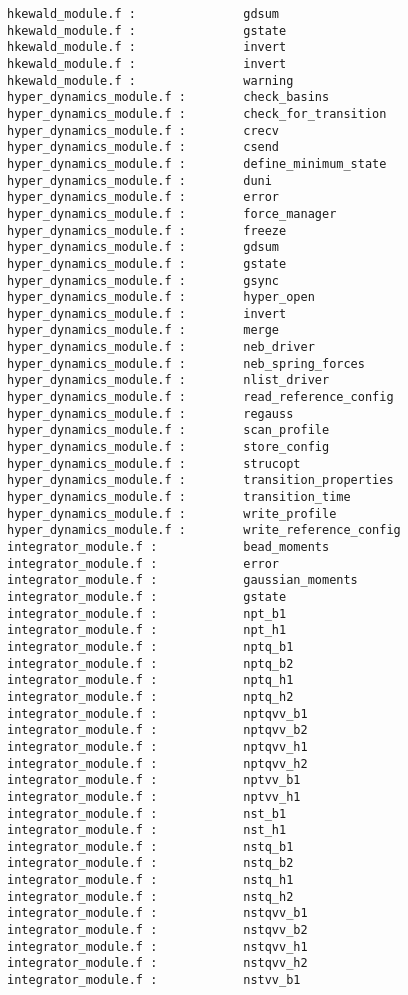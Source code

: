 \begin{verbatim}
hkewald_module.f :               gdsum 
hkewald_module.f :               gstate 
hkewald_module.f :               invert 
hkewald_module.f :               invert 
hkewald_module.f :               warning 
hyper_dynamics_module.f :        check_basins 
hyper_dynamics_module.f :        check_for_transition 
hyper_dynamics_module.f :        crecv 
hyper_dynamics_module.f :        csend 
hyper_dynamics_module.f :        define_minimum_state 
hyper_dynamics_module.f :        duni
hyper_dynamics_module.f :        error 
hyper_dynamics_module.f :        force_manager 
hyper_dynamics_module.f :        freeze 
hyper_dynamics_module.f :        gdsum 
hyper_dynamics_module.f :        gstate 
hyper_dynamics_module.f :        gsync 
hyper_dynamics_module.f :        hyper_open 
hyper_dynamics_module.f :        invert 
hyper_dynamics_module.f :        merge 
hyper_dynamics_module.f :        neb_driver 
hyper_dynamics_module.f :        neb_spring_forces 
hyper_dynamics_module.f :        nlist_driver 
hyper_dynamics_module.f :        read_reference_config 
hyper_dynamics_module.f :        regauss 
hyper_dynamics_module.f :        scan_profile 
hyper_dynamics_module.f :        store_config 
hyper_dynamics_module.f :        strucopt 
hyper_dynamics_module.f :        transition_properties 
hyper_dynamics_module.f :        transition_time 
hyper_dynamics_module.f :        write_profile 
hyper_dynamics_module.f :        write_reference_config 
integrator_module.f :            bead_moments 
integrator_module.f :            error 
integrator_module.f :            gaussian_moments 
integrator_module.f :            gstate 
integrator_module.f :            npt_b1 
integrator_module.f :            npt_h1 
integrator_module.f :            nptq_b1 
integrator_module.f :            nptq_b2 
integrator_module.f :            nptq_h1 
integrator_module.f :            nptq_h2 
integrator_module.f :            nptqvv_b1 
integrator_module.f :            nptqvv_b2 
integrator_module.f :            nptqvv_h1 
integrator_module.f :            nptqvv_h2 
integrator_module.f :            nptvv_b1 
integrator_module.f :            nptvv_h1 
integrator_module.f :            nst_b1 
integrator_module.f :            nst_h1 
integrator_module.f :            nstq_b1 
integrator_module.f :            nstq_b2 
integrator_module.f :            nstq_h1 
integrator_module.f :            nstq_h2 
integrator_module.f :            nstqvv_b1 
integrator_module.f :            nstqvv_b2 
integrator_module.f :            nstqvv_h1 
integrator_module.f :            nstqvv_h2 
integrator_module.f :            nstvv_b1 

\end{verbatim}
